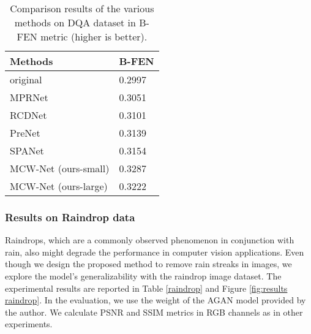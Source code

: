 \documentclass[a4paper,fleqn]{cas-dc}
\begin{document}
\begin{table}[]
	\tabcolsep 0.15in{\scriptsize{}}
	\centering
	\caption{Comparison results of the various methods on DQA dataset in B-FEN \cite{wu2020subjective} metric (higher is better).  }
	\vspace{0.15cm}
	
	\begin{tabular*}{\tblwidth}{@{}LL@{}}
		\toprule
		Methods                    & B-FEN  \\\midrule
		original                 & 0.2997 \\MPRNet            & 0.3051 \\RCDNet            & 0.3101 \\PreNet            & 0.3139 \\SPANet            & 0.3154 \\MCW-Net (ours-small)   & 0.3287 \\MCW-Net (ours-large)   & 0.3222 \\ \bottomrule
	\end{tabular*}
	
	\smallskip
	\label{bfen}
\end{table}

\subsubsection{Results on Raindrop data}
\label{subsec:results_raindrop}

Raindrops, which are a commonly observed phenomenon in conjunction with rain, also might degrade the performance in computer vision applications. Even though we design the proposed method to remove rain streaks in images, we explore the model's generalizability with the raindrop image dataset. The experimental results are reported in Table \ref{raindrop} and Figure \ref{fig:results raindrop}. In the evaluation, we use the weight of the AGAN model provided by the author. We calculate PSNR and SSIM metrics in RGB channels as in other experiments. 
\end{document}

